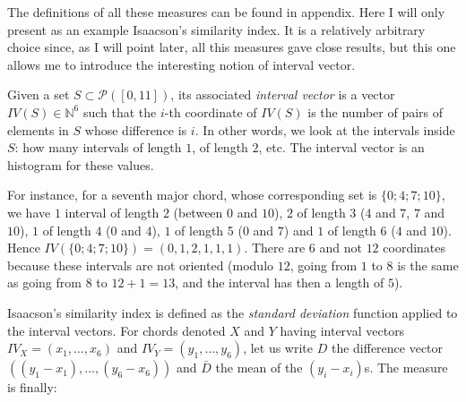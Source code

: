 \documentclass[a4paper,10pt]{article}
\begin{document}

The definitions of all these measures can be found in appendix. Here I will only present as an example Isaacson's similarity index. It is a relatively arbitrary choice since, as I will point later, all this measures gave close results, but this one allows me to introduce the interesting notion of interval vector.

Given a set $S\subset\mathcal{P}([0,11])$, its associated \emph{interval vector} is a vector $IV(S)\in\mathbb{N}^6$ such that the $i$-th coordinate of $IV(S)$ is the number of pairs of elements in $S$ whose difference is $i$. In other words, we look at the intervals inside $S$: how many intervals of length $1$, of length $2$, etc. The interval vector is an histogram for these values. 

For instance, for a seventh major chord, whose corresponding set is $\{0;4;7;10\}$, we have $1$ interval of length $2$ (between $0$ and $10$), $2$ of length $3$ ($4$ and $7$, $7$ and $10$), $1$ of length $4$ ($0$ and $4$), $1$ of length 5 ($0$ and $7$) and $1$ of length $6$ ($4$ and $10$). Hence $IV(\{0;4;7;10\})=(0,1,2,1,1,1)$. There are $6$ and not $12$ coordinates because these intervals are not oriented (modulo $12$, going from $1$ to $8$ is the same as going from $8$ to $12+1=13$, and the interval has then a length of $5$).

Isaacson's similarity index is defined as the \emph{standard deviation} function applied to the interval vectors. For chords denoted $X$ and $Y$ having interval vectors $IV_X=(x_1,\dots,x_6)$ and $IV_Y=(y_1,\dots,y_6)$, let us write $D$ the difference vector $((y_1-x_1),\dots,(y_6-x_6))$ and $\bar{D}$ the mean of the $(y_i-x_i)$s. The measure is finally:
\end{document}
